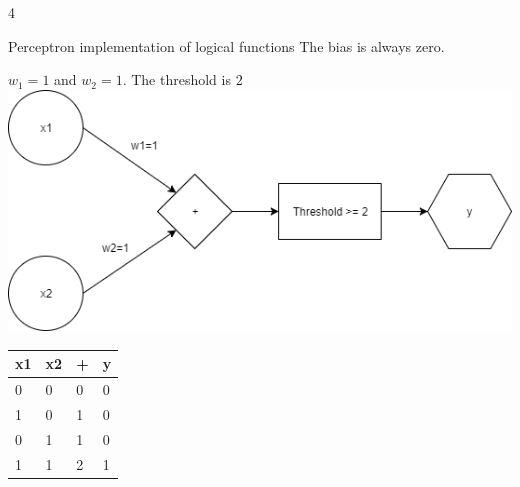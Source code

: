 \documentclass{article}
\begin{document}
    \begin{ukon-infie}[22.11.17]{4}

        \begin{exercise}[p=11]{Perceptron implementation of logical functions}
        The bias is always zero.
        
        	\question{}
        	{ $w_1 = 1$ and $w_2 = 1$. The threshold is $2$\\
        	\includegraphics[scale=0.5]{A1a.png}} 
\begin{tabular}{|l|l|l|l|}
\hline
\textbf{x1} & \textbf{x2} & \textbf{+} & \textbf{y} \\ \hline
0           & 0           & 0          & 0          \\ \hline
1           & 0           & 1          & 0          \\ \hline
0           & 1           & 1          & 0          \\ \hline
1           & 1           & 2          & 1          \\ \hline
\end{tabular}


\end{exercise}
\end{ukon-infie}
\end{document}
